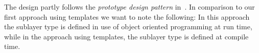 %

The
design partly follows  the {\em prototype design pattern}
in~\cite{designpatterns}. In comparison to our first approach
using templates we want to note the following: In this approach
the sublayer type is defined in
use of object oriented programming at run time, while in the
approach using templates, the sublayer type is defined at compile
time. 

